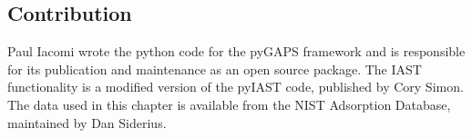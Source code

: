 \subsection*{Contribution}

Paul Iacomi wrote the python code for the pyGAPS framework and is 
responsible for its publication and maintenance as an open source
package. The IAST functionality is a modified version of
the pyIAST code, published by Cory Simon. The data used in this chapter 
is available from the NIST Adsorption Database, maintained by Dan Siderius.

